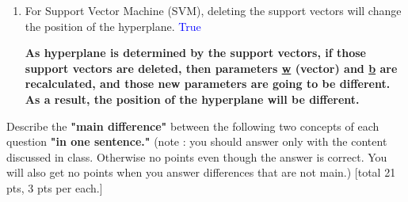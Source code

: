 \documentclass{homework}
\begin{document}
\begin{enumerate}
        \item {For Support Vector Machine (SVM), deleting the support vectors will change the position of the hyperplane.} \textcolor{blue}{True}
        
        \textbf{As hyperplane is determined by the support vectors, if those support vectors are deleted, then parameters \underline{w} (vector) and \underline{b} are recalculated, and those new parameters are going to be different. As a result, the position of the hyperplane will be different. }
        
        
        
        
    
    \end{enumerate}
    
    \exercise*
    Describe the \textbf{"main difference"} between the following two concepts of each question \textbf{"in one sentence."} (note : you should answer only with the content discussed in class. Otherwise no points even though the answer is correct. You will also get no points when you answer differences that are not main.) [total 21 pts, 3 pts per each.]
\end{document}
